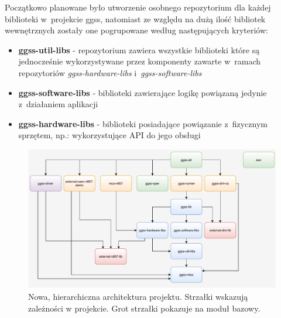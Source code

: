 Początkowo planowane było utworzenie osobnego repozytorium dla każdej biblioteki w~projekcie \gls*{ggss}, natomiast ze względu na dużą ilość bibliotek wewnętrznych zostały one pogrupowane według następujących kryteriów:
\begin{itemize}
\item \textbf{ggss-util-libs} - repozytorium zawiera wszystkie biblioteki które są jednocześnie wykorzystywane przez komponenty zawarte w~ramach repozytoriów \textit{ggss-hardware-libs} i~\textit{ggss-software-libs}
\item \textbf{ggss-software-libs} - biblioteki zawierające logikę powiązaną jedynie z~działaniem aplikacji
\item \textbf{ggss-hardware-libs} - biblioteki posiadające powiązanie z~fizycznym sprzętem, np.: wykorzystujące API do jego obsługi
\end{itemize}\par

\newpage

\begin{landscape}

\begin{figure}[H]
\centering
\includegraphics[width=1.5\textwidth]{res/topLevelArchitecture}
\caption{Nowa, hierarchiczna architektura projektu. Strzałki wskazują zależności w projekcie. Grot strzałki pokazuje na moduł bazowy.}
\label{fig:topLevArch}
\end{figure}

\end{landscape}

\newpage

